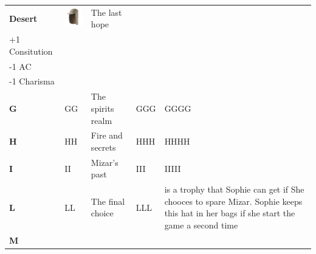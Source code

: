 \begin{longtable}[H]{|p{2cm}|p{1.5cm}|p{2cm}|p{2.8cm}|p{6.3cm}|}
\textbf{Desert}                      & \includegraphics[width=1.4cm]{Images/Hats/desert}             & The last hope                                                                      & \begin{tabular}[c]{@{}l@{}}+3 HP\\ +1 Consitution\\ -1 AC\\ -1 Charisma\end{tabular} &                                                                                                                                       \\ \hline
\textbf{G}                           & GG                                                            & The spirits realm                                                                  & GGG                                                                                  & GGGG                                                                                                                                  \\ \hline
\textbf{H}                           & HH                                                            & Fire and secrets                                                                   & HHH                                                                                  & HHHH                                                                                                                                  \\ \hline
\textbf{I}                           & II                                                            & Mizar's past                                                                       & III                                                                                  & IIIII                                                                                                                                 \\ \hline
\textbf{L}                           & LL                                                            & The final choice                                                                   & LLL                                                                                  & is a trophy that Sophie can get if She chooces to spare Mizar. Sophie keeps this hat in her bags if she start the game a second time  \\ \hline
\textbf{M}         
  \end{longtable}
